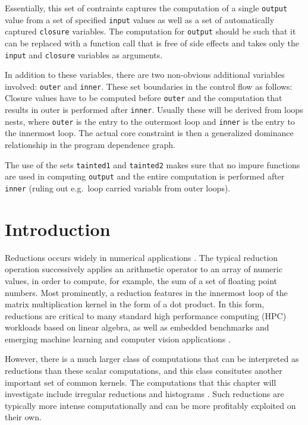     Essentially, this set of contraints captures the computation of a
    single \texttt{output} value from a set of specified \texttt{input}
    values as well as a set of automatically captured \texttt{closure}
    variables.  The computation for \texttt{output} should be such that it
    can be replaced with a function call that is free of side effects and
    takes only the \texttt{input} and \texttt{closure} variables as
    arguments.

    In addition to these variables, there are two non-obvious additional
    variables involved: \texttt{outer} and \texttt{inner}.
    These set boundaries in the control flow as follows: Closure values have to
    be computed before \texttt{outer} and the computation that results in outer
    is performed after \texttt{inner}.
    Usually these will be derived from loops nests, where \texttt{outer} is the
    entry to the outermost loop and \texttt{inner} is the entry to the innermost
    loop.
    The actual core constraint is then a generalized dominance relationship in
    the program dependence graph.

    The use of the sets \texttt{tainted1} and \texttt{tainted2} makes sure that
    no impure functions are used in computing \texttt{output} and the entire
    computation is performed after \texttt{inner} (ruling out e.g.\ loop carried
    variabls from outer loops).


\newpage
\section{Introduction}

    Reductions occurs widely in numerical applications
    \cite{hall1996maximizing}.
    The typical reduction operation successively applies an arithmetic
    operator to an array of numeric values, in order to compute, for
    example, the sum of a set of floating point numbers.
    Most prominently, a reduction features in the innermost loop of the matrix
    multiplication kernel in the form of a dot product.
    In this form, reductions are critical to many standard high performance
    computing (HPC) workloads based on linear algebra, as well as embedded
    benchmarks and emerging machine learning and computer vision applications
    \cite{Reddy2016Reduction}.

    However, there is a much larger class of computations that can be
    interpreted as reductions than these scalar computations, and this class
    consitutes another important set of common kernels.
    The computations that this chapter will investigate include irregular
    reductions and histograms \cite{Han:2000:ILA:645678.663936}.
    Such reductions are typically more intense computationally and can be
    more profitably exploited on their own.

